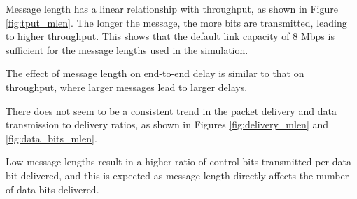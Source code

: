 \documentclass{winslabreport}
\begin{document}
Message length has a linear relationship with throughput, as shown in Figure \ref{fig:tput_mlen}. The longer the message, the more bits are transmitted, leading to higher throughput. This shows that the default link capacity of 8 Mbps is sufficient for the message lengths used in the simulation.

The effect of message length on end-to-end delay is similar to that on throughput, where larger messages lead to larger delays.

There does not seem to be a consistent trend in the packet delivery and data transmission to delivery ratios, as shown in Figures \ref{fig:delivery_mlen} and \ref{fig:data_bits_mlen}.

Low message lengths result in a higher ratio of control bits transmitted per data bit delivered, and this is expected as message length directly affects the number of data bits delivered.
\end{document}
